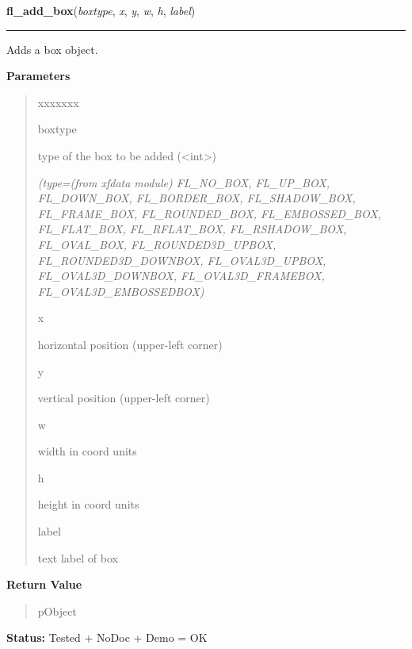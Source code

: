 \hspace{.8\funcindent}\begin{boxedminipage}{\funcwidth}

    \raggedright \textbf{fl\_add\_box}(\textit{boxtype}, \textit{x}, \textit{y}, \textit{w}, \textit{h}, \textit{label})

    \vspace{-1.5ex}

    \rule{\textwidth}{0.5\fboxrule}
\setlength{\parskip}{2ex}
    Adds a box object.

\setlength{\parskip}{1ex}
      \textbf{Parameters}
      \vspace{-1ex}

      \begin{quote}
        \begin{Ventry}{xxxxxxx}

          \item[boxtype]

          type of the box to be added ({\textless}int{\textgreater})

            {\it (type=(from xfdata module) FL\_NO\_BOX, FL\_UP\_BOX, FL\_DOWN\_BOX, 
FL\_BORDER\_BOX, FL\_SHADOW\_BOX, FL\_FRAME\_BOX, FL\_ROUNDED\_BOX, 
FL\_EMBOSSED\_BOX, FL\_FLAT\_BOX, FL\_RFLAT\_BOX, FL\_RSHADOW\_BOX, 
FL\_OVAL\_BOX, FL\_ROUNDED3D\_UPBOX, FL\_ROUNDED3D\_DOWNBOX, 
FL\_OVAL3D\_UPBOX, FL\_OVAL3D\_DOWNBOX, FL\_OVAL3D\_FRAMEBOX, 
FL\_OVAL3D\_EMBOSSEDBOX)}

          \item[x]

          horizontal position (upper-left corner)

          \item[y]

          vertical position (upper-left corner)

          \item[w]

          width in coord units

          \item[h]

          height in coord units

          \item[label]

          text label of box

        \end{Ventry}

      \end{quote}

      \textbf{Return Value}
    \vspace{-1ex}

      \begin{quote}
      pObject

      \end{quote}

\textbf{Status:} Tested + NoDoc + Demo = OK



    \end{boxedminipage}

